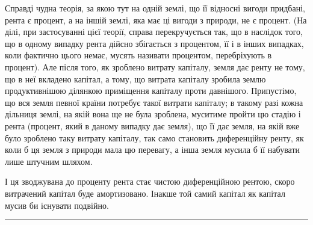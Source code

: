 Справді чудна теорія, за якою тут на одній землі, що її відносні вигоди
придбані, рента є процент, а на іншій землі, яка має ці вигоди з природи, не
є процент. (На ділі, при застосуванні цієї теорії, справа перекручується так, що в
наслідок того, що в одному випадку рента дійсно збігається з процентом, її і в інших
випадках, коли фактично цього немає, мусять називати процентом, перебріхують
в процент). Але після того, як зроблено витрату капіталу, земля дає ренту не тому,
що в неї вкладено капітал, а тому, що витрата капіталу зробила землю продуктивнішою
ділянкою приміщення капіталу проти давнішого. Припустімо,
що вся земля певної країни потребує такої витрати капіталу; в такому разі
кожна дільниця землі, на якій вона ще не була зроблена, муситиме пройти цю
стадію і рента (процент, який в даному випадку дає земля), що її дає земля, на
якій вже було зроблено таку витрату капіталу, так само становить диференційну
ренту, як коли б ця земля з природи мала цю перевагу, а інша земля
мусила б її набувати лише штучним шляхом.

І ця зводжувана до проценту рента стає чистою диференційною рентою,
скоро витрачений капітал буде амортизовано. Інакше той самий капітал як
капітал мусив би існувати подвійно.

\pfbreak
